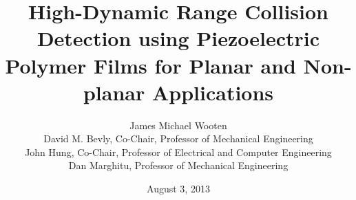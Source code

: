 \documentclass{beamer}
\title[PVDF Collision Sensor]{High-Dynamic Range Collision Detection using Piezoelectric Polymer Films for Planar and Non-planar Applications}
\author[J. M. Wooten]{ James Michael Wooten\\ {\small David M. Bevly, Co-Chair, Professor of Mechanical Engineering\\ John Hung, Co-Chair, Professor of Electrical and Computer Engineering\\ Dan Marghitu, Professor of Mechanical Engineering}}
\date{August 3, 2013} %
\begin{document}
\frame{\titlepage}
\end{document}
